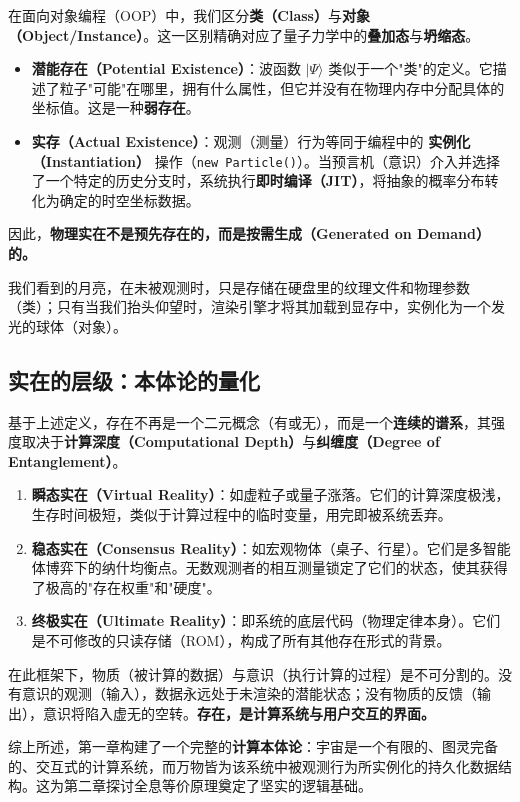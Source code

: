 在面向对象编程（OOP）中，我们区分\textbf{类（Class）}与\textbf{对象（Object/Instance）}。这一区别精确对应了量子力学中的\textbf{叠加态}与\textbf{坍缩态}。

\begin{itemize}
\item \textbf{潜能存在（Potential Existence）}：波函数 $|\Psi\rangle$ 类似于一个"类"的定义。它描述了粒子"可能"在哪里，拥有什么属性，但它并没有在物理内存中分配具体的坐标值。这是一种\textbf{弱存在}。

\item \textbf{实存（Actual Existence）}：观测（测量）行为等同于编程中的 \textbf{实例化（Instantiation）} 操作（\texttt{new Particle()}）。当预言机（意识）介入并选择了一个特定的历史分支时，系统执行\textbf{即时编译（JIT）}，将抽象的概率分布转化为确定的时空坐标数据。
\end{itemize}

因此，\textbf{物理实在不是预先存在的，而是按需生成（Generated on Demand）的。}

我们看到的月亮，在未被观测时，只是存储在硬盘里的纹理文件和物理参数（类）；只有当我们抬头仰望时，渲染引擎才将其加载到显存中，实例化为一个发光的球体（对象）。

\subsection{实在的层级：本体论的量化}

基于上述定义，存在不再是一个二元概念（有或无），而是一个\textbf{连续的谱系}，其强度取决于\textbf{计算深度（Computational Depth）}与\textbf{纠缠度（Degree of Entanglement）}。

\begin{enumerate}
\item \textbf{瞬态实在（Virtual Reality）}：如虚粒子或量子涨落。它们的计算深度极浅，生存时间极短，类似于计算过程中的临时变量，用完即被系统丢弃。

\item \textbf{稳态实在（Consensus Reality）}：如宏观物体（桌子、行星）。它们是多智能体博弈下的纳什均衡点。无数观测者的相互测量锁定了它们的状态，使其获得了极高的"存在权重"和"硬度"。

\item \textbf{终极实在（Ultimate Reality）}：即系统的底层代码（物理定律本身）。它们是不可修改的只读存储（ROM），构成了所有其他存在形式的背景。
\end{enumerate}

\begin{corollary}[唯心与唯物的统一]
在此框架下，物质（被计算的数据）与意识（执行计算的过程）是不可分割的。没有意识的观测（输入），数据永远处于未渲染的潜能状态；没有物质的反馈（输出），意识将陷入虚无的空转。\textbf{存在，是计算系统与用户交互的界面。}
\end{corollary}

综上所述，第一章构建了一个完整的\textbf{计算本体论}：宇宙是一个有限的、图灵完备的、交互式的计算系统，而万物皆为该系统中被观测行为所实例化的持久化数据结构。这为第二章探讨全息等价原理奠定了坚实的逻辑基础。
